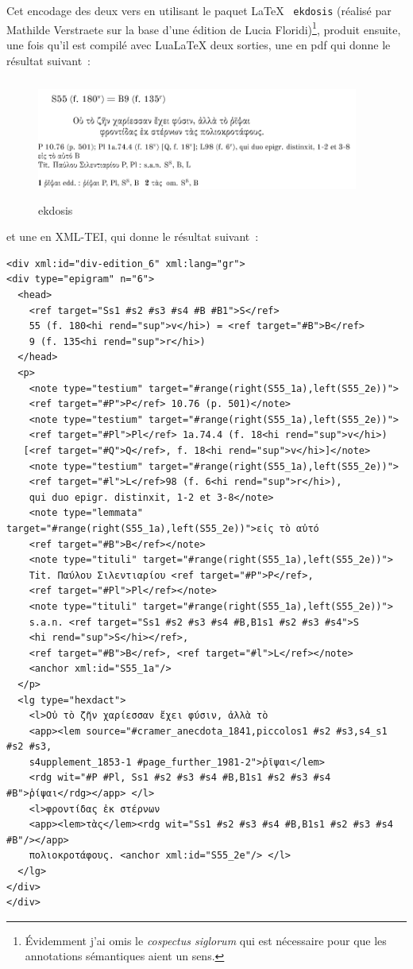 \normalsize

Cet encodage des deux vers en utilisant le paquet \LaTeX~
\texttt{ekdosis} (réalisé par Mathilde Verstraete sur la base d'une
édition de Lucia Floridi)\footnote{Évidemment j'ai omis le
  \emph{cospectus siglorum} qui est nécessaire pour que les annotations
  sémantiques aient un sens.}, produit ensuite, une fois qu'il est
compilé avec LuaLaTeX deux sorties, une en pdf qui donne le résultat
suivant~:

\begin{figure}
\centering
\includegraphics[width=4.16667in,height=1.5625in]{s55ekdosis.png}
\caption{ekdosis}
\end{figure}

et une en XML-TEI, qui donne le résultat suivant~:

\scriptsize
\begin{verbatim}
<div xml:id="div-edition_6" xml:lang="gr">
<div type="epigram" n="6">
  <head>
    <ref target="Ss1 #s2 #s3 #s4 #B #B1">S</ref>
    55 (f. 180<hi rend="sup">v</hi>) = <ref target="#B">B</ref>
    9 (f. 135<hi rend="sup">r</hi>)
  </head>
  <p>
    <note type="testium" target="#range(right(S55_1a),left(S55_2e))">
    <ref target="#P">P</ref> 10.76 (p. 501)</note>
    <note type="testium" target="#range(right(S55_1a),left(S55_2e))">
    <ref target="#Pl">Pl</ref> 1a.74.4 (f. 18<hi rend="sup">v</hi>) 
   [<ref target="#Q">Q</ref>, f. 18<hi rend="sup">v</hi>]</note>
    <note type="testium" target="#range(right(S55_1a),left(S55_2e))">
    <ref target="#l">L</ref>98 (f. 6<hi rend="sup">r</hi>), 
    qui duo epigr. distinxit, 1-2 et 3-8</note>
    <note type="lemmata" target="#range(right(S55_1a),left(S55_2e))">εἰς τὸ αὐτό 
    <ref target="#B">B</ref></note>
    <note type="tituli" target="#range(right(S55_1a),left(S55_2e))">
    Tit. Παύλου Σιλεντιαρίου <ref target="#P">P</ref>, 
    <ref target="#Pl">Pl</ref></note>
    <note type="tituli" target="#range(right(S55_1a),left(S55_2e))">
    s.a.n. <ref target="Ss1 #s2 #s3 #s4 #B,B1s1 #s2 #s3 #s4">S
    <hi rend="sup">S</hi></ref>, 
    <ref target="#B">B</ref>, <ref target="#l">L</ref></note>
    <anchor xml:id="S55_1a"/>
  </p>
  <lg type="hexdact">
    <l>Οὐ τὸ ζῆν χαρίεσσαν ἔχει φύσιν, ἀλλὰ τὸ 
    <app><lem source="#cramer_anecdota_1841,piccolos1 #s2 #s3,s4_s1 #s2 #s3,
    s4upplement_1853-1 #page_further_1981-2">ῥῖψαι</lem>
    <rdg wit="#P #Pl, Ss1 #s2 #s3 #s4 #B,B1s1 #s2 #s3 #s4 #B">ῥίψαι</rdg></app> </l>
    <l>φροντίδας ἐκ στέρνων 
    <app><lem>τὰς</lem><rdg wit="Ss1 #s2 #s3 #s4 #B,B1s1 #s2 #s3 #s4 #B"/></app> 
    πολιοκροτάφους. <anchor xml:id="S55_2e"/> </l>
  </lg>
</div>
</div>

\end{verbatim}
\normalsize

